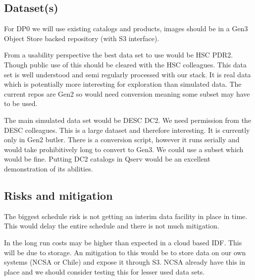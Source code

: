 \subsection {Dataset(s)} \label{sec:dataset}

For DP0 we will use existing catalogs and products, images should be in a Gen3 Object Store backed repository (with S3 interface).

From a usability perspective the best data set to use would be HSC PDR2. Though public use of
this should be cleared with the HSC colleagues. This data set is well understood and semi regularly processed with our stack.  It is real data which is potentially more interesting for exploration than simulated data. The current repos are Gen2 so would need conversion meaning some subset may have to be used.

The main simulated data set would be DESC DC2. We need permission from the DESC colleagues. This is a large dataset and therefore interesting. It is currently only in Gen2 butler. There is a conversion script, however it
runs serially and would take prohibitively long to convert to Gen3. We could use a subset which would be fine.  Putting DC2 catalogs in Qserv would be an excellent demonstration of its abilities.


\subsection{Risks and mitigation}

The biggest schedule risk is not getting an interim data facility in place in time.
This would delay the entire schedule and there is not much mitigation.

In the long run costs may be higher than expected in a cloud based IDF. This will be due to storage.
An mitigation to this would be to store data on our own systems (NCSA or Chile) and expose it through S3.
NCSA already have this in place and we should consider testing this for lesser used data sets.

